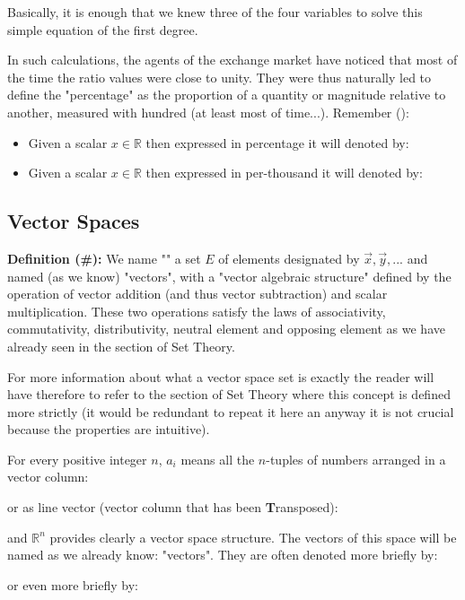 	Basically, it is enough that we knew three of the four variables to solve this simple equation of the first degree.

	In such calculations, the agents of the exchange market have noticed that most of the time the ratio values were close to unity. They were thus naturally led to define the "percentage" as the proportion of a quantity or magnitude relative to another, measured with hundred (at least most of time...). Remember ():

	\begin{itemize}
		\item Given a scalar $x \in \mathbb{R}$ then expressed in percentage it will denoted by:
			
		\item Given a scalar $x \in \mathbb{R}$ then expressed in per-thousand it will denoted by:
			
	\end{itemize}

	\subsection{Vector Spaces}
	\textbf{Definition (\#\mydef):} We name "" a set $E$ of elements designated by $\vec{x},\vec{y},...$ and named (as we know) "vectors", with a "vector algebraic structure" defined by the operation of vector addition (and thus vector subtraction) and scalar multiplication. These two operations satisfy the laws of associativity, commutativity, distributivity, neutral element and opposing element as we have already seen in the section of Set Theory.

	For more information about what a vector space set is exactly  the reader will have therefore to refer to the section of Set Theory where this concept is defined more strictly (it would be redundant to repeat it here an anyway it is not crucial because the properties are intuitive).

	For every positive integer $n$, $a_i$ means all the $n$-tuples of numbers arranged in a vector column:
	
	or as line vector (vector column that has been \textbf{T}ransposed):
	
	and $\mathbb{R}^n$ provides clearly a vector space structure. The vectors of this space will be named as we already know: "vectors". They are often denoted more briefly by:
	
	or even more briefly by:
	
